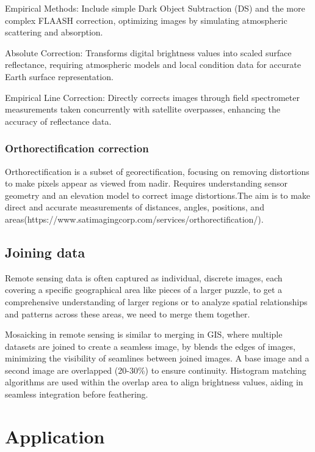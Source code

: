 \documentclass[
  letterpaper,
  DIV=11,
  numbers=noendperiod]{scrreprt}
\begin{document}
Empirical Methods: Include simple Dark Object Subtraction (DS) and the
more complex FLAASH correction, optimizing images by simulating
atmospheric scattering and absorption.

Absolute Correction: Transforms digital brightness values into scaled
surface reflectance, requiring atmospheric models and local condition
data for accurate Earth surface representation.

Empirical Line Correction: Directly corrects images through field
spectrometer measurements taken concurrently with satellite overpasses,
enhancing the accuracy of reflectance data.

\subsection{Orthorectification
correction}\label{orthorectification-correction}

Orthorectification is a subset of georectification, focusing on removing
distortions to make pixels appear as viewed from nadir. Requires
understanding sensor geometry and an elevation model to correct image
distortions.The aim is to make direct and accurate measurements of
distances, angles, positions, and
areas(https://www.satimagingcorp.com/services/orthorectification/).

\section{Joining data}\label{joining-data}

Remote sensing data is often captured as individual, discrete images,
each covering a specific geographical area like pieces of a larger
puzzle, to get a comprehensive understanding of larger regions or to
analyze spatial relationships and patterns across these areas, we need
to merge them together.

Mosaicking in remote sensing is similar to merging in GIS, where
multiple datasets are joined to create a seamless image, by blends the
edges of images, minimizing the visibility of seamlines between joined
images. A base image and a second image are overlapped (20-30\%) to
ensure continuity. Histogram matching algorithms are used within the
overlap area to align brightness values, aiding in seamless integration
before feathering.


\chapter{Application}\label{application-1}
\end{document}
